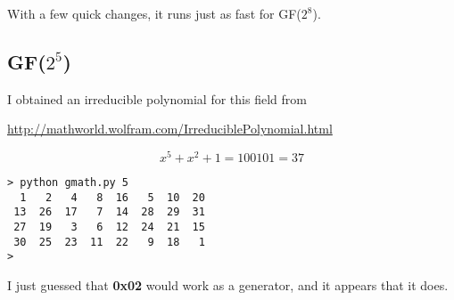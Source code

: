 \documentclass[11pt, oneside]{article}
\begin{document}
With a few quick changes, it runs just as fast for GF($2^8$).

\subsection*{GF($2^5$)}

I obtained an irreducible polynomial for this field from

\url{http://mathworld.wolfram.com/IrreduciblePolynomial.html}

\[ x^5 + x^2 + 1 = 100101 = 37 \]

\begin{verbatim}
> python gmath.py 5
  1   2   4   8  16   5  10  20
 13  26  17   7  14  28  29  31
 27  19   3   6  12  24  21  15
 30  25  23  11  22   9  18   1
>
\end{verbatim}

I just guessed that \textbf{0x02} would work as a generator, and it appears that it does.
\end{document}
